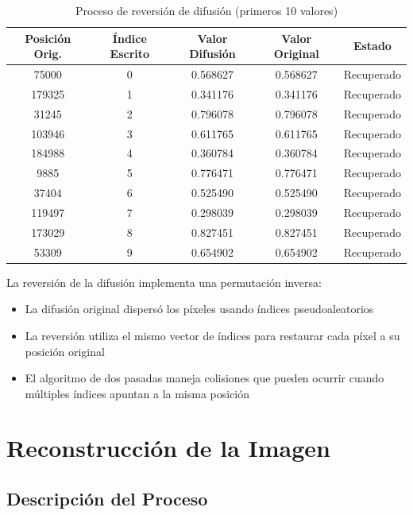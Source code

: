 \documentclass[12pt,a4paper]{article}
\begin{document}
	\begin{table}[H]
		\centering
		\caption{Proceso de reversión de difusión (primeros 10 valores)}
		\label{tab:reversion_difusion}
		\begin{tabular}{@{}ccccc@{}}
			\toprule
			\textbf{Posición Orig.} & \textbf{Índice Escrito} & \textbf{Valor Difusión} & \textbf{Valor Original} & \textbf{Estado} \\ \midrule
			75000 & 0 & 0.568627 & 0.568627 & Recuperado \\
			179325 & 1 & 0.341176 & 0.341176 & Recuperado \\
			31245 & 2 & 0.796078 & 0.796078 & Recuperado \\
			103946 & 3 & 0.611765 & 0.611765 & Recuperado \\
			184988 & 4 & 0.360784 & 0.360784 & Recuperado \\
			9885 & 5 & 0.776471 & 0.776471 & Recuperado \\
			37404 & 6 & 0.525490 & 0.525490 & Recuperado \\
			119497 & 7 & 0.298039 & 0.298039 & Recuperado \\
			173029 & 8 & 0.827451 & 0.827451 & Recuperado \\
			53309 & 9 & 0.654902 & 0.654902 & Recuperado \\ \bottomrule
		\end{tabular}
	\end{table}
	
	La reversión de la difusión implementa una permutación inversa:
	
	\begin{itemize}
		\item La difusión original dispersó los píxeles usando índices pseudoaleatorios
		\item La reversión utiliza el mismo vector de índices para restaurar cada píxel a su posición original
		\item El algoritmo de dos pasadas maneja colisiones que pueden ocurrir cuando múltiples índices apuntan a la misma posición
	\end{itemize}
	
	\section{Reconstrucción de la Imagen}
	
	\subsection{Descripción del Proceso}
	
\end{document}
